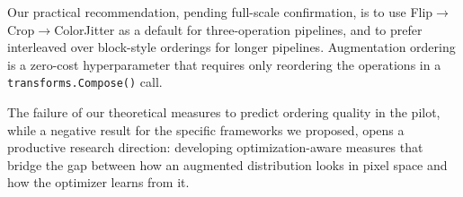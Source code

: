 \documentclass{article}
\begin{document}
Our practical recommendation, pending full-scale confirmation, is to use Flip$\to$Crop$\to$ColorJitter as a default for three-operation pipelines, and to prefer interleaved over block-style orderings for longer pipelines. Augmentation ordering is a zero-cost hyperparameter that requires only reordering the operations in a \texttt{transforms.Compose()} call.

The failure of our theoretical measures to predict ordering quality in the pilot, while a negative result for the specific frameworks we proposed, opens a productive research direction: developing optimization-aware measures that bridge the gap between how an augmented distribution looks in pixel space and how the optimizer learns from it.



\end{document}
